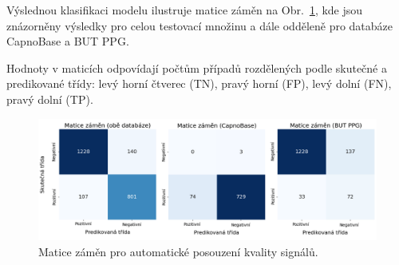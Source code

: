 \begin{table}[!ht]
	\centering
	\caption[Srovnání klasifikační přesnosti automatického hodnocení kvality]{Souhrnné metriky přesnosti klasifikace automatického posouzení kvality signálů pro jednotlivé databáze a třídy.}
	\label{tab:vysledky_kvalita}
\end{table}

Výslednou klasifikaci modelu ilustruje matice záměn na Obr.~\ref{fig:confusion_matrix_kvalita}, kde jsou znázorněny výsledky pro celou testovací množinu a dále odděleně pro databáze CapnoBase a \acs{BUT PPG}.

Hodnoty v maticích odpovídají počtům případů rozdělených podle skutečné a predikované třídy: levý horní čtverec (\acs{TN}), pravý horní (\acs{FP}), levý dolní (\acs{FN}), pravý dolní (\acs{TP}).

\begin{figure}[ht]
	\centering
	\includegraphics[width=1\textwidth]{./obrazky/vysledky/confusion_matrix_rf.png}
	\caption[Matice záměn pro automatické posouzení kvality signálů]{Matice záměn pro automatické posouzení kvality signálů.}
	\label{fig:confusion_matrix_kvalita}
\end{figure}

